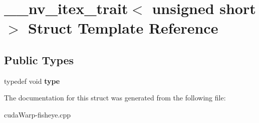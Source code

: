 \hypertarget{struct____nv__itex__trait_3_01unsigned_01short_01_4}{}\section{\+\_\+\+\_\+nv\+\_\+itex\+\_\+trait$<$ unsigned short $>$ Struct Template Reference}
\label{struct____nv__itex__trait_3_01unsigned_01short_01_4}
\subsection*{Public Types}
\begin{DoxyCompactItemize}
\item 
typedef void {\bfseries type}\hypertarget{struct____nv__itex__trait_3_01unsigned_01short_01_4_acfd158b5103f798893f5a6c8691817c1}{}\label{struct____nv__itex__trait_3_01unsigned_01short_01_4_acfd158b5103f798893f5a6c8691817c1}

\end{DoxyCompactItemize}


The documentation for this struct was generated from the following file\+:\begin{DoxyCompactItemize}
\item 
cuda\+Warp-\/fisheye.\+cpp\end{DoxyCompactItemize}
